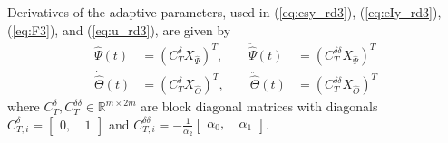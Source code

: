 Derivatives of the adaptive parameters, used in (\ref{eq:esy_rd3}), (\ref{eq:eIy_rd3}), (\ref{eq:F3}), and (\ref{eq:u_rd3}), are given by
\begin{equation}
\begin{aligned}
	\dot{\hat{\Psi}}(t) &= (C_T^\delta X_{\hat{\Psi}})^T, \qquad \ddot{\hat{\Psi}}(t) &= (C_T^{\delta\delta}X_{\hat{\Psi}})^T \\
	\dot{\hat{\Theta}}(t) &= (C_T^\delta X_{\hat{\Theta}})^T, \qquad \ddot{\hat{\Theta}}(t) &= (C_T^{\delta\delta}X_{\hat{\Theta}})^T
\end{aligned} \label{eq:rd3-adaptation-deriv}
\end{equation}
where $C_T^{\delta}, C_T^{\delta \delta} \in \mathbb{R}^{m \times 2m}$ are block diagonal matrices with diagonals $C_{T,i}^{\delta} = \begin{bmatrix} 0,~ & 1	\end{bmatrix}$ and $C_{T,i}^{\delta\delta} = -\frac{1}{\alpha_2}\begin{bmatrix} \alpha_0,~ & \alpha_1 \end{bmatrix}$. 

